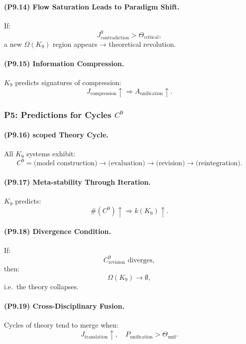 \paragraph{(P9.14) Flow Saturation Leads to Paradigm Shift.}
If:
\[
J_{\mathrm{contradiction}}^9 > \Theta_{\mathrm{critical}},
\]
a new $\Omega(K_9)$ region appears → theoretical revolution.

\paragraph{(P9.15) Information Compression.}
$K_9$ predicts signatures of compression:
\[
J_{\mathrm{compression}} \uparrow
\Rightarrow
A_{\mathrm{unification}} \uparrow.
\]

\subsubsection{P5: Predictions for Cycles \texorpdfstring{$C^9$}{C^9}}

\paragraph{(P9.16) scoped Theory Cycle.}
All $K_9$ systems exhibit:
\[
C^9
=
\text{(model construction)}
\to
\text{(evaluation)}
\to
\text{(revision)}
\to
\text{(reintegration)}.
\]

\paragraph{(P9.17) Meta-stability Through Iteration.}
$K_9$ predicts:
\[
\#(C^9) \uparrow
\Rightarrow
k(K_9) \uparrow.
\]

\paragraph{(P9.18) Divergence Condition.}
If:
\[
C_{\mathrm{revision}}^9 \text{ diverges},
\]
then:
\[
\Omega(K_9) \to \emptyset,
\]
i.e.\ the theory collapses.

\paragraph{(P9.19) Cross-Disciplinary Fusion.}
Cycles of theory tend to merge when:
\[
J_{\mathrm{translation}} \uparrow,
\quad
P_{\mathrm{unification}} > \Theta_{\mathrm{unif}}.
\]

